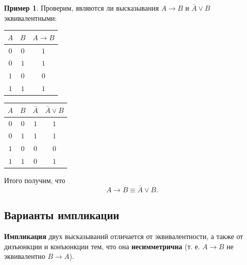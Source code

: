 \documentclass[a5paper, 11pt]{extarticle}
\theoremstyle{definition}
\newtheorem*{example*}{Пример}
\theoremstyle{definition}
\theoremstyle{definition}
\numberwithin{figure}{section}
\numberwithin{table}{section}
\begin{document}
\begin{example*}
    Проверим, являются ли высказывания \(A \to B\) и \(\bar{A} \lor B\) эквивалентными:

    \begin{minipage}[c]{0.5\textwidth}
        \renewcommand*{\arraystretch}{1.5}
        \begin{longtable}{|c|c|c|}
            \hline
            \(A\) & \(B\) & \(A \to B\) \\
            \hline
            \(0\) & \(0\) & \(1\)       \\
            \hline
            \(0\) & \(1\) & \(1\)       \\
            \hline
            \(1\) & \(0\) & \(0\)       \\
            \hline
            \(1\) & \(1\) & \(1\)       \\
            \hline
        \end{longtable}
    \end{minipage}
    \begin{minipage}[c]{0.5\textwidth}
        \renewcommand*{\arraystretch}{1.5}
        \begin{longtable}{|c|c|c|c|}
            \hline
            \(A\) & \(B\) & \(\bar{A}\) & \(\bar{A} \lor B\) \\
            \hline
            \(0\) & \(0\) & \(1\)       & \(1\)              \\
            \hline
            \(0\) & \(1\) & \(1\)       & \(1\)              \\
            \hline
            \(1\) & \(0\) & \(0\)       & \(0\)              \\
            \hline
            \(1\) & \(1\) & \(0\)       & \(1\)              \\
            \hline
        \end{longtable}
    \end{minipage}

    \vspace*{1em}

    Итого получим, что
    \[
        A \to B \equiv \bar{A} \lor B.
    \]
\end{example*}

\subsection{Варианты импликации}

\textbf{Импликация} двух высказываний отличается от эквивалентности, а также от дизъюнкции и конъюнкции тем, что она \textbf{несимметрична} (т. е. \(A \to B\) не эквивалентно \(B \to A\)).
\end{document}
